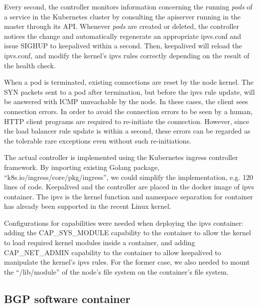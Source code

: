 Every second, the controller monitors information concerning the running {\em pods} of a service in the Kubernetes cluster by consulting the apiserver running in the master through its API.
Whenever {\em pods} are created or deleted, the controller notices the change and automatically regenerate an appropriate ipvs.conf 
and issue SIGHUP to keepalived within a second.
Then, keepalived will reload the ipvs.conf, and modify the kernel's ipvs rules correctly depending on the result of the health check.

When a pod is terminated, existing connections are reset by the node kernel.
The SYN packets sent to a pod after termination, but before the ipvs rule update, will be answered with ICMP unreachable by the node.
In these cases, the client sees connection errors.
In order to avoid the connection errors to be seen by a human, HTTP client programs are required to re-initiate the connection.
However, since the load balancer rule update is within a second, these errors can be regarded as the tolerable rare exceptions even without such re-initiations.

The actual controller\cite{ktaka_ccmp_2017_826894} is implemented using the Kubernetes ingress controller\cite{K8sIngress2017} framework. 
By importing existing Golang package, \enquote{k8s.io/ingress/core/pkg/ingress}, we could simplify the implementation, e.g. 
120 lines of code.  
%
Keepalived and the controller are placed in the docker image of ipvs container.
The ipvs is the kernel function and namespace separation for container has already been supported in the recent Linux kernel. 

Configurations for capabilities were needed when deploying the ipvs container: adding the CAP\_SYS\_MODULE capability 
to the container to allow the kernel to load required kernel modules inside a container, 
and adding CAP\_NET\_ADMIN capability to the container to allow keepalived to manipulate the kernel's ipvs rules. 
For the former case, we also needed to mount the \enquote{/lib/module} of the node's file system on the container's file system.

\subsection{BGP software container}

